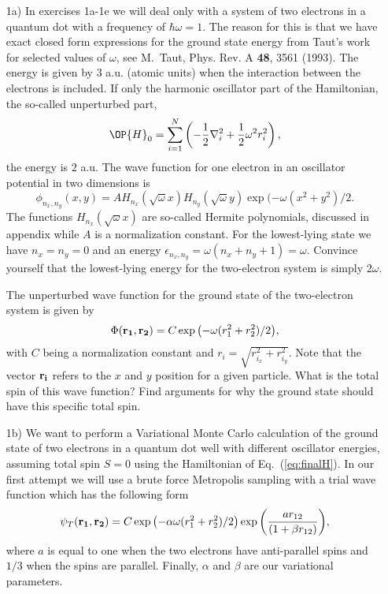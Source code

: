 \begin{prob}
\begin{enumerate}
\item[1a)]  In exercises 1a-1e we will deal only with a system of 
two electrons in a quantum dot with a frequency of $\hbar\omega = 1$. 
The reason for this is that we have exact closed form expressions 
for the ground state energy from Taut's work for selected values of $\omega$, 
see M.~Taut, Phys. Rev. A {\bf 48}, 3561 (1993).
The energy is given by $3$ a.u.  (atomic units) when the interaction between the electrons is included.
If only the harmonic oscillator part of the Hamiltonian,
the so-called unperturbed part,
\[ \OP{H}_0=\sum_{i=1}^{N} \left(  -\frac{1}{2} \nabla_i^2 + \frac{1}{2} \omega^2r_i^2  \right),\]
the energy is $2$ a.u.
The wave function for one electron in an oscillator potential in two dimensions is
\[
\phi_{n_x,n_y}(x,y) = A H_{n_x}(\sqrt{\omega}x)H_{n_y}(\sqrt{\omega}y)\exp{(-\omega(x^2+y^2)/2}.
\]
The functions $H_{n_x}(\sqrt{\omega}x)$ are so-called Hermite polynomials, discussed in appendix while $A$ is a normalization constant. 
For the lowest-lying state we have $n_x=n_y=0$ and an energy $\epsilon_{n_x,n_y}=\omega(n_x+n_y+1) = \omega$.
Convince yourself that the lowest-lying energy for the two-electron system  is simply $2\omega$.

The unperturbed wave function for the ground state of the two-electron system is given by 
\[
\Phi({\bf r_1},{\bf r_2}) = C\exp{\left(-\omega(r_1^2+r_2^2)/2\right)},
\]
with $C$ being a normalization constant and $r_i = \sqrt{r_{i_x}^2+r_{i_y}^2}$. Note that the vector ${\bf r_i}$ 
refers to the $x$ and $y$ position for a given particle.
What is the total spin of this wave function? Find arguments for why the ground state should have
this specific total spin. 

\item[1b)] We want to perform  a Variational Monte Carlo calculation of the ground state of two electrons in a quantum dot well with different oscillator energies, assuming total spin $S=0$ using the Hamiltonian of 
Eq.~(\ref{eq:finalH}). 
In our first attempt we will use a brute force Metropolis sampling with a trial wave function which has the following form
\begin{equation}
   \psi_{T}({\bf r_1},{\bf r_2}) = 
   C\exp{\left(-\alpha\omega(r_1^2+r_2^2)/2\right)}
   \exp{\left(\frac{ar_{12}}{(1+\beta r_{12})}\right)}, 
\label{eq:trial}
\end{equation}
where $a$ is equal to one when the two electrons have anti-parallel spins and $1/3$ when the spins are parallel. Finally, $\alpha$ and $\beta$ are our variational parameters.


\end{enumerate}
\end{prob}
